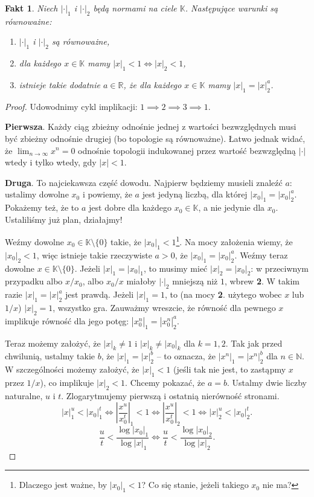 \documentclass[a4paper,fleqn,9pt]{extarticle}
\newtheorem{fkt}{Fakt}
\newenvironment{enumx}{\begin{enumerate}
	\setlength{\itemsep}{0pt}
	\setlength{\parskip}{0pt}
	\setlength{\parsep}{0pt}}
{\end{enumerate}}
\begin{document}
\begin{fkt}Niech $|\cdot|_1$ i $|\cdot|_2$ będą normami na ciele $\mathbb K$. Następujące warunki są równoważne:
\begin{enumx}
\item $|\cdot|_1$ i $|\cdot|_2$ są równoważne,
\item dla każdego $x\in\mathbb K$ mamy $|x|_1 < 1 \iff |x|_2 < 1$,
\item istnieje takie dodatnie $a \in \mathbb R$, że dla każdego $x\in\mathbb K$ mamy $|x|_1 = |x|_2^a$.
\end{enumx}\end{fkt}
\begin{proof}Udowodnimy cykl implikacji: $1\implies2\implies3\implies1$.

\textbf{Pierwsza}. Każdy ciąg zbieżny odnośnie jednej z wartości bezwzględnych musi być zbieżny odnośnie drugiej (bo topologie są równoważne). Łatwo jednak widać, że $\lim_{n\rightarrow \infty} x^n = 0$ odnośnie topologii indukowanej przez wartość bezwzględną $|\cdot|$ wtedy i tylko wtedy, gdy $|x|<1$.

\textbf{Druga}. To najciekawsza część dowodu. Najpierw będziemy musieli znaleźć $a$: ustalimy dowolne $x_0$ i powiemy, że $a$ jest jedyną liczbą, dla której $|x_0|_1 = |x_0|_2^a$. Pokażemy też, że to $a$ jest dobre dla każdego $x_0 \in \mathbb K$, a nie jedynie dla $x_0$. Ustaliliśmy już plan, działajmy!

Weźmy dowolne $x_0\in\mathbb K\setminus\{0\}$ takie, że $|x_0|_1 < 1$\footnote{Dlaczego jest ważne, by $|x_0|_1 < 1$? Co się stanie, jeżeli takiego $x_0$ nie ma?}. Na mocy założenia wiemy, że $|x_0|_2 < 1$, więc istnieje takie rzeczywiste $a > 0$, że $|x_0|_1 = |x_0|_2^a$. Weźmy teraz dowolne $x\in\mathbb K\setminus\{0\}$. Jeżeli $|x|_1 = |x_0|_1$, to musimy mieć $|x|_2 = |x_0|_2$: w przeciwnym przypadku albo $x/x_0$, albo $x_0/x$ miałoby $|\cdot|_2$ mniejszą niż $1$, wbrew \textbf{2}. W takim razie $|x|_1 = |x|_2^a$ jest prawdą. Jeżeli $|x|_1 = 1$, to (na mocy \textbf{2}. użytego wobec $x$ lub $1/x$) $|x|_2 = 1$, wszystko gra. Zauważmy wreszcie, że równość dla pewnego $x$ implikuje równość dla jego potęg: $|x_0^n|_1 = |x_0^n|_2^a$.

Teraz możemy założyć, że $|x|_k \neq 1$ i $|x|_k \neq |x_0|_k$ dla $k = 1,2$. Tak jak przed chwilunią, ustalmy takie $b$, że $|x|_1 = |x|_2^b$ -- to oznacza, że $|x^n|_1 = |x^n|_2^b$ dla $n\in\mathbb N$. W szczególności możemy założyć, że $|x|_1 < 1$ (jeśli tak nie jest, to zastąpmy $x$ przez $1/x$), co implikuje $|x|_2 < 1$. Chcemy pokazać, że $a = b$. Ustalmy dwie liczby naturalne, $u$ i $t$. Zlogarytmujemy pierwszą i ostatnią nierówność stronami. \begin{equation*}|x|_1^u < |x_0|_1^t \iff \left|\frac{x^u}{x_0^t}\right|_1 < 1 \iff \left|\frac{x^u}{x_0^t}\right|_2 < 1 \iff |x|_2^u < |x_0|_2^t.\end{equation*}
\begin{equation*}\frac{u}{t} < \frac{\log |x_0|_1}{\log |x|_1} \iff \frac{u}{t} < \frac{\log |x_0|_2}{\log |x|_2}.\end{equation*}


\end{proof}
\end{document}
